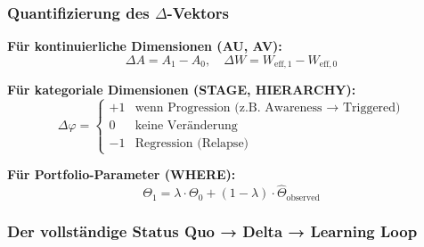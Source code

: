 \subsubsection{Quantifizierung des $\Delta$-Vektors}

\textbf{Für kontinuierliche Dimensionen (AU, AV):}
\begin{equation}
\Delta A = A_1 - A_0, \quad \Delta W = W_{\text{eff},1} - W_{\text{eff},0}
\end{equation}

\textbf{Für kategoriale Dimensionen (STAGE, HIERARCHY):}
\begin{equation}
\Delta\varphi = \begin{cases}
+1 & \text{wenn Progression (z.B.\ Awareness → Triggered)} \\
0 & \text{keine Veränderung} \\
-1 & \text{Regression (Relapse)}
\end{cases}
\end{equation}

\textbf{Für Portfolio-Parameter (WHERE):}
\begin{equation}
\Theta_1 = \lambda \cdot \Theta_0 + (1-\lambda) \cdot \hat{\Theta}_{\text{observed}}
\label{eq:20-bayesian-theta-update}
\end{equation}

\subsubsection{Der vollständige Status Quo → Delta → Learning Loop}

